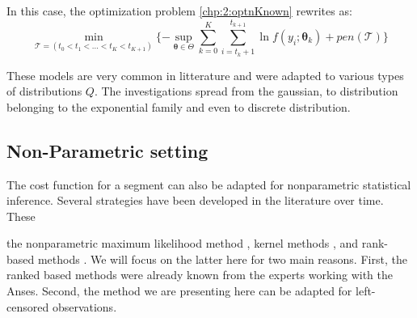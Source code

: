 In this case, the optimization problem \ref{chp:2:optnKnown} rewrites as: 
\begin{equation}\label{chp:2:penlik}
\min_{\mathcal{T} = (t_0 < t_1 < ... < t_K < t_{K+1})} \{ -\sup_{\bm \theta \in \Theta} \sum_{k=0}^K \sum_{i = t_k+1}^{t_{k+1}} \ln f(y_i; \bm \theta_k) + pen(\mathcal{T}) \} 
\end{equation}       

These models are very common in litterature and were adapted to various types of distributions $Q$. The investigations spread from the gaussian, to distribution belonging to the exponential family and even to discrete distribution. 

\subsection{Non-Parametric setting}\label{chp2:sec:multrank}

The cost function for a segment can also be adapted for nonparametric statistical inference. Several strategies have been developed in the literature over time. These 



 the nonparametric maximum likelihood method \cite{Zou2014,Einmahl2003}, kernel methods \cite{Harchaoui2008,li2015m}, and rank-based methods \cite{Pettitt1980,Wang2019}. We will focus on the latter here for two main reasons. First, the ranked based methods were already known from the experts working with the Anses. Second, the method we are presenting here can be adapted for left-censored observations.  

